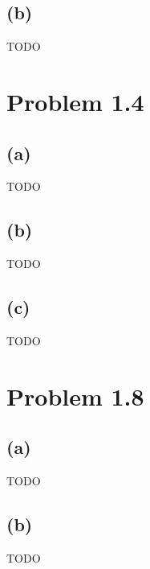 \documentclass[a4paper]{article}
\begin{document}
\subsection{(b)}
TODO

\section{Problem 1.4}
\subsection{(a)}
TODO

\subsection{(b)}
TODO

\subsection{(c)}
TODO

\section{Problem 1.8}
\subsection{(a)}
TODO

\subsection{(b)}
TODO
\end{document}
